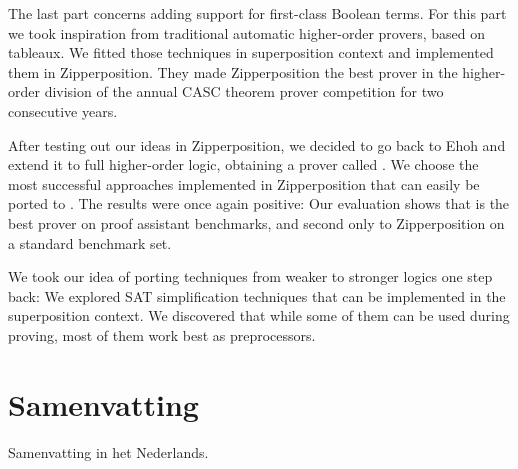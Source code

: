 The last part concerns adding support for
first-class Boolean terms. For this part we took inspiration from traditional
automatic higher-order provers, based on tableaux. We fitted those techniques in
superposition context and implemented them in Zipperposition. They
made Zipperposition the best prover in the higher-order division of the annual CASC
theorem prover competition for two consecutive years.

After testing out our ideas in Zipperposition, we decided to go back to Ehoh and
extend it to full higher-order logic, obtaining a prover called \ehohii{}. We
choose the most successful approaches implemented in Zipperposition that can
easily be ported to \ehohii{}. The results were once again positive: Our
evaluation shows that \ehohii{} is the best prover on proof assistant
benchmarks, and second only to Zipperposition on a standard benchmark set.

We took our idea of porting techniques from weaker to stronger logics one step
back: We explored SAT simplification techniques that can be implemented in the
superposition context. We discovered that while some of them can be used during proving,
most of them work best as preprocessors.


\chapter*{Samenvatting}

{

  Samenvatting in het Nederlands.
}



